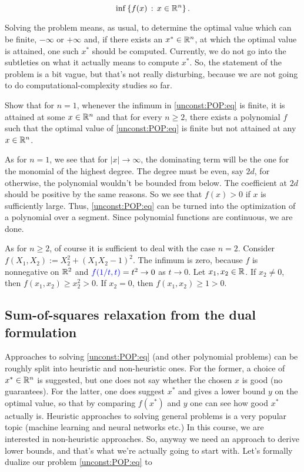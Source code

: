 \begin{equation}
	\inf \left\{ f(x) \,:\, x \in \mathbb{R}^n \right\}. \label{unconst:POP:eq}
\end{equation}

Solving the problem means, as usual, to determine the optimal value which can be finite, $-\infty$ or $+\infty$ and, if there exists an $x^\ast \in \mathbb{R}^n$, at which the optimal value is attained, one such $x^\ast$ should be computed. Currently, we do not go into the subtleties on what it actually means to compute $x^\ast$. So, the statement of the problem is a bit vague, but that's not really disturbing, because we are not going to do computational-complexity studies so far. 


\begin{exercise}
	Show that for $n=1$, whenever the infimum in \eqref{unconst:POP:eq} is finite, it is attained at some $x \in \mathbb{R}^n$ and that for every $n \ge 2$, there exists a polynomial $f$ such that the optimal value of \eqref{unconst:POP:eq} is finite but not attained at any $x \in \mathbb{R}^n$. 
\end{exercise}
\begin{solution}
	As for $n=1$, we see that for $|x| \to \infty$, the dominating term will be the one for the monomial of the highest degree. The degree must be even, say $2d$, for otherwise, the polynomial wouldn't be bounded from below. The coefficient at $2d$ should be positive by the same reasons. So we see that $f(x)>0$ if $x$ is sufficiently large. Thus, \eqref{unconst:POP:eq} can be turned into the optimization of a polynomial over a  segment. Since polynomial functions are continuous, we are done. 
	
	As for $n \ge 2$, of course it is sufficient to deal with the case $n=2$. Consider $f(X_1,X_2) := X_2^2 + (X_1 X_2 -1)^2$. The infimum is zero, because $f$ is nonnegative on $\mathbb{R}^2$ and $\textcolor{blue}{f(1/t,t)} = t^2 \to 0$ as $t \to 0$. Let $x_1, x_2 \in \mathbb{R}$. If $x_2 \ne 0$, then $f(x_1,x_2) \ge x_2^2 > 0$. If $x_2=0$, then $f(x_1,x_2) \ge 1 > 0$. 
\end{solution}

\subsection{Sum-of-squares relaxation from the dual formulation}

Approaches to solving \eqref{unconst:POP:eq} (and other polynomial problems) can be roughly split into heuristic and non-heuristic ones. For the former, a choice of $x^\ast \in \mathbb{R}^n$ is suggested, but one does not say whether the chosen $x$ is good (no guarantees). For the latter, one does suggest $x^\ast$ and gives a lower bound $y$ on the optimal value, so that by comparing $f(x^\ast)$ and $y$ one can see how good $x^\ast$ actually is. Heuristic approaches to solving general problems is a very popular topic (machine learning and neural networks etc.) In this course, we are interested in non-heuristic approaches. So, anyway we need an approach to derive lower bounds, and that's what we're actually going to start with. Let's formally dualize our problem \eqref{unconst:POP:eq} to

